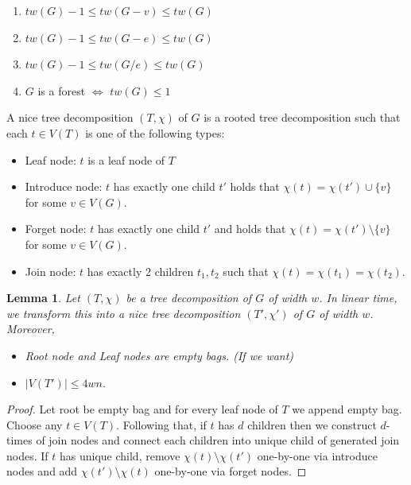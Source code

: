 \documentclass[12pt, a4paper, openany, twoside]{book}
\newtheorem{lem}[thm]{Lemma}
\theoremstyle{definition}
\theoremstyle{remark}
\theoremstyle{plain}
\numberwithin{equation}{section}
\begin{document}
\begin{tcolorbox}[colback=yellow!10!white,colframe=blue!75!black,title=Propositions,breakable]
    \begin{enumerate}
        \item[(1)] $tw(G) - 1 \leq tw(G - v) \leq tw(G)$
        \item[(2)] $tw(G) - 1 \leq tw(G - e) \leq tw(G)$
        \item[(3)] $tw(G) - 1 \leq tw(G/e) \leq tw(G)$
        \item[(4)] $G$ is a forest $\iff$ $tw(G) \leq 1$  
    \end{enumerate}
\end{tcolorbox}

\begin{tcolorbox}[colback=yellow!10!white,colframe=green!75!black,title=Nice Tree Decomposition]

A nice tree decomposition $(T, \chi)$ of $G$ is a rooted tree decomposition such that each $t \in V(T)$ is one of the following types: 
\begin{itemize}
    \item Leaf node: $t$ is a leaf node of $T$
    \item Introduce node: $t$ has exactly one child $t'$ holds that $\chi(t) = \chi(t') \cup \{v\}$ for some $v \in V(G)$. 
    \item Forget node: $t$ has exactly one child $t'$ and holds that $\chi(t) = \chi(t') \setminus \{v\}$ for some $v \in V(G)$. 
    \item Join node: $t$ has exactly 2 children $t_1, t_2$ such that $\chi(t) = \chi(t_1) = \chi(t_2)$. 
\end{itemize}

\end{tcolorbox}

\begin{lem}
    Let $(T, \chi)$ be a tree decomposition of $G$ of width $w$. In linear time, we transform this into a nice tree decomposition $(T', \chi')$ of $G$ of width $w$. Moreover, 
    \begin{itemize}
        \item Root node and Leaf nodes are empty bags. (If we want)
        \item $|V(T')| \leq 4wn$. 
    \end{itemize}
\end{lem}

\begin{proof}
    Let root be empty bag and for every leaf node of $T$ we append empty bag. Choose any $t \in V(T)$. 
    Following that, if $t$ has $d$ children then we construct $d$-times of join nodes and connect each children into unique child of generated join nodes. 
    If $t$ has unique child, remove $\chi(t) \setminus \chi(t')$ one-by-one via introduce nodes and add $\chi(t') \setminus \chi(t)$ one-by-one via forget nodes. 
\end{proof}
\end{document}
